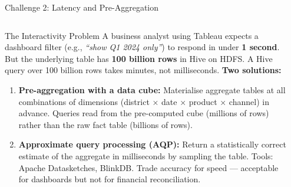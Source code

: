 \documentclass[aspectratio=169,10pt]{beamer}
\begin{document}
\begin{frame}{Challenge 2: Latency and Pre-Aggregation}
  \begin{columns}[T]
      \begin{block}{The Interactivity Problem}
        A business analyst using Tableau expects a dashboard filter (e.g., \textit{``show Q1 2024 only''}) to respond in under \textbf{1 second}.  But the underlying table has \textbf{100 billion rows} in Hive on HDFS.  A Hive query over 100 billion rows takes minutes, not milliseconds.
        \vspace{4pt}
        \textbf{Two solutions:}
        \begin{enumerate}
          \item \textbf{Pre-aggregation with a data cube:}  Materialise aggregate tables at all combinations of dimensions (district $\times$ date $\times$ product $\times$ channel) in advance.  Queries read from the pre-computed cube (millions of rows) rather than the raw fact table (billions of rows).
          \item \textbf{Approximate query processing (AQP):}  Return a statistically correct estimate of the aggregate in milliseconds by sampling the table.  Tools: Apache Datasketches, BlinkDB.  Trade accuracy for speed --- acceptable for dashboards but not for financial reconciliation.
        \end{enumerate}
      \end{block}

      \begin{center}
\end{center}
\end{columns}
\end{frame}
\end{document}
